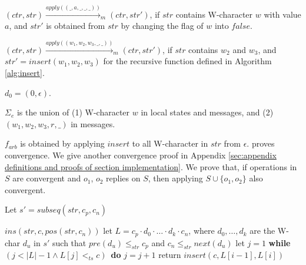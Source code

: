 {\begin{itemize}
{\item[-] $(\mathit{ctr},\mathit{str}) \xrightarrow{\mathit{apply}((\_,a,\_,\_,\_))}_m (\mathit{ctr},\mathit{str}')$, if $\mathit{str}$ contains W-character $w$ with value $a$, and $\mathit{str}'$ is obtained from $\mathit{str}$ by changing the flag of $w$ into $\mathit{false}$.

\item[-] $(\mathit{ctr},\mathit{str}) \xrightarrow{\mathit{apply}((w_1,w_2,w_3,\_,\_))}_m (\mathit{ctr},\mathit{str}')$, if $\mathit{str}$ contains $w_2$ and $w_3$, and $\mathit{str}' = \mathit{insert}(w_1,w_2,w_3)$ for the recursive function defined in Algorithm \ref{alg:insert}.
}

\item[-] $d_0 = (0,\epsilon)$.

\item[-] $\Sigma_e$ is the union of (1) W-character $w$ in local states and messages, and (2) $(w_1,w_2,w_3,r,\_)$ in messages.

\item[-] {\color {red}$f_{arb}$ is obtained by applying $\mathit{insert}$ to all W-character in $\mathit{str}$ from $\epsilon$. \cite{Oster:2006} proves convergence. We give another convergence proof in Appendix \ref{sec:appendix definitions and proofs of section implementation}. We prove that, if operations in $S$ are convergent and $o_1$, $o_2$ replies on $S$, then applying $S \cup \{ o_1,o_2 \}$ also convergent.}



\end{itemize}

\begin{algorithm}[t]

Let $s' = \mathit{subseq}(\mathit{str},c_p,c_n)$ \;

{
    \Return $\mathit{ins}(\mathit{str},c,\mathit{pos}(\mathit{str},c_n))$\;
}
\Else
{
    let $L = c_p \cdot d_0 \cdot \ldots \cdot d_k \cdot c_n$, where $d_0,\ldots,d_k$ are the W-char $d_u$ in $s'$ such that $\mathit{pre}(d_u) \leq_{\mathit{str}} c_p$ and $c_n \leq_{\mathit{str}} \mathit{next}(d_u)$\;
    let $j = 1$\;
    {\bf while} $(j < \vert L \vert -1 \wedge L[j] <_{\mathit{ts}} c)$\ {\bf do}
    {
        $j = j+1$\;
    }
    return $\mathit{insert}(c,L[i-1],L[i])$\;
}
\caption{$\mathit{insert}$}
\label{alg:insert}
\end{algorithm}
}

